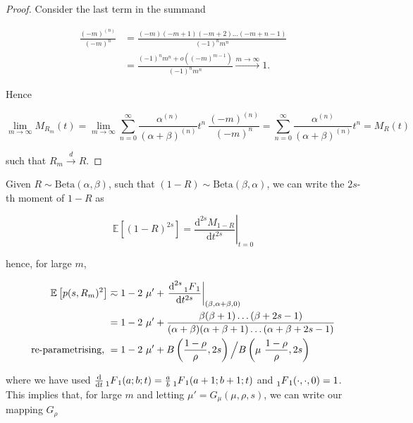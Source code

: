 \documentclass[american, abstract=on]{scrartcl}
\theoremstyle{plain}
\newcommand{\E}{\mathbb{E}}
\newcommand{\Beta}{\text{Beta}}
\begin{document}
\begin{proof}
    
    Consider the last term in the summand 

    \begin{equation}
        \begin{split}
            \frac{(-m)^{(n)}}{(-m)^n} &= \frac{(-m)(-m + 1)(-m + 2)\ldots(-m + n - 1)}{(-1)^n m^n} \\
            &= \frac{(-1)^n m^n + o((-m)^{m - 1})}{(-1)^n m^n} \xrightarrow{m\rightarrow \infty} 1.
        \end{split}
    \end{equation}

    Hence 

    \begin{equation}
        \lim_{m \rightarrow \infty} M_{R_m}(t) = \lim_{m \rightarrow \infty}\sum^{\infty}_{n=0} \frac{\alpha^{(n)}}{(\alpha + \beta)^{(n)}} t^n \  \frac{(-m)^{(n)}}{(-m)^n} = \sum^{\infty}_{n=0} \frac{\alpha^{(n)}}{(\alpha + \beta)^{(n)}} t^n = M_R(t)
    \end{equation}

    such that $R_m \xrightarrow{d} R$.

\end{proof}

Given $R \sim \Beta(\alpha, \beta)$, such that $(1 - R) \sim \Beta(\beta, \alpha)$, we can write the $2s$-th moment of $1 - R$ as 

\begin{equation}
    \E[(1 - R)^{2s}] =  \left.\frac{\text{d}^{2s} M_{1 - R}}{\text{d}t^{2s}}\right\rvert_{t = 0} 
\end{equation}

hence, for large $m$,

\begin{equation}
    \begin{split}
        \E \left[p(s, R_m)^2\right] &\eqsim 1 - 2 \ \mu' + \left.\frac{\text{d}^{2s} \prescript{}{1}{F}_1}{\text{d}t^{2s}} \right\rvert_{(\beta, \alpha + \beta, 0)} \\
        &= 1 - 2 \ \mu' + \frac{\beta(\beta + 1)\ldots(\beta + 2s - 1)}{(\alpha + \beta)(\alpha + \beta + 1) \ldots (\alpha + \beta + 2s - 1)} \\
        \text{re-parametrising, } 
        &= 1 - 2 \ \mu' + B\left(\frac{1 - \rho}{\rho}, 2s \right) \Big/ B\left(\mu \ \frac{1 - \rho}{\rho}, 2s \right)
    \end{split}
\end{equation}

where we have used $\frac{\text{d}}{\text{d}t} \prescript{}{1}{F}_1(a; b; t) = \frac{a}{b} \prescript{}{1}{F}_1(a + 1; b + 1; t)$ and $\prescript{}{1}{F}_1(\cdot, \cdot, 0) = 1$. This implies that, for large $m$ and letting $\mu' = G_\mu(\mu, \rho, s)$, we can write our mapping $G_{\rho}$
\end{document}
